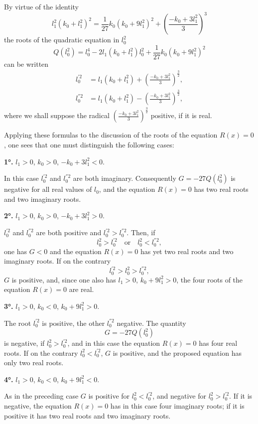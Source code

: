 \documentclass{article}
\begin{document}
By virtue of the identity
\[
l_1^2(k_0 + l_1^2)^2 = \frac{1}{27}k_0(k_0 + 9l_1^2)^2 + \left(\frac{-k_0 + 3l_1^2}{3}\right)^3
\]
the roots of the quadratic equation in $l_0^2$
\[
Q(l_0^2) = l_0^4 - 2l_1(k_0 + l_1^2)l_0^2 + \frac{1}{27}k_0(k_0 + 9l_1^2)^2
\]
can be written
\begin{align*}
l_0^{'2} &= l_1(k_0 + l_1^2) + \left(\frac{-k_0 + 3l_1^2}{3}\right)^{\frac{3}{2}}, \\
l_0^{''2} &= l_1(k_0 + l_1^2) - \left(\frac{-k_0 + 3l_1^2}{3}\right)^{\frac{3}{2}},
\end{align*}
where we shall suppose the radical $\left(\frac{-k_0 + 3l_1^2}{3}\right)^{\frac{3}{2}}$ positive, if it is real.

Applying these formulas to the discussion of the roots of the equation $R(x) = 0$, one sees that one must distinguish the following cases:

\textbf{1°.} $l_1 > 0$, $k_0 > 0$, $-k_0 + 3l_1^2 < 0$.

In this case $l_0^{'2}$ and $l_0^{''2}$ are both imaginary. Consequently $G = -27Q(l_0^2)$ is negative for all real values of $l_0$, and the equation $R(x) = 0$ has two real roots and two imaginary roots.

\textbf{2°.} $l_1 > 0$, $k_0 > 0$, $-k_0 + 3l_1^2 > 0$.

$l_0^{'2}$ and $l_0^{''2}$ are both positive and $l_0^{'2} > l_0^{''2}$. Then, if
\[
l_0^2 > l_0^{'2} \quad \text{or} \quad l_0^2 < l_0^{''2},
\]
one has $G < 0$ and the equation $R(x) = 0$ has yet two real roots and two imaginary roots. If on the contrary
\[
l_0^{'2} > l_0^2 > l_0^{''2},
\]
$G$ is positive, and, since one also has $l_1 > 0$, $k_0 + 9l_1^2 > 0$, the four roots of the equation $R(x) = 0$ are real.

\textbf{3°.} $l_1 > 0$, $k_0 < 0$, $k_0 + 9l_1^2 > 0$.

The root $l_0^{'2}$ is positive, the other $l_0^{''2}$ negative. The quantity
\[
G = -27Q(l_0^2)
\]
is negative, if $l_0^2 > l_0^{'2}$, and in this case the equation $R(x) = 0$ has four real roots. If on the contrary $l_0^2 < l_0^{'2}$, $G$ is positive, and the proposed equation has only two real roots.

\textbf{4°.} $l_1 > 0$, $k_0 < 0$, $k_0 + 9l_1^2 < 0$.

As in the preceding case $G$ is positive for $l_0^2 < l_0^{'2}$, and negative for $l_0^2 > l_0^{'2}$. If it is negative, the equation $R(x) = 0$ has in this case four imaginary roots; if it is positive it has two real roots and two imaginary roots.
\end{document}

